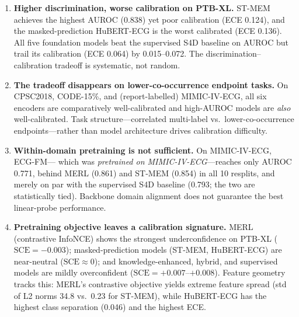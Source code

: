 \begin{enumerate}
  \item \textbf{Higher discrimination, worse calibration on PTB-XL.} ST-MEM achieves the
    highest AUROC (0.838) yet poor calibration (ECE 0.124), and the masked-prediction
    HuBERT-ECG is the worst calibrated (ECE 0.136). All five foundation models beat the
    supervised S4D baseline on AUROC but trail its calibration (ECE 0.064) by 0.015--0.072.
    The discrimination--calibration tradeoff is systematic, not random.

  \item \textbf{The tradeoff disappears on lower-co-occurrence endpoint tasks.} On CPSC2018,
    CODE-15\%, and (report-labelled) MIMIC-IV-ECG, all six encoders are comparatively
    well-calibrated and high-AUROC models are \emph{also} well-calibrated. Task
    structure---correlated multi-label vs.\ lower-co-occurrence endpoints---rather than model
    architecture drives calibration difficulty.

  \item \textbf{Within-domain pretraining is not sufficient.} On MIMIC-IV-ECG, ECG-FM---
    which was \emph{pretrained on MIMIC-IV-ECG}---reaches only AUROC 0.771, behind MERL
    (0.861) and ST-MEM (0.854) in all 10 resplits, and merely on par with the supervised
    S4D baseline (0.793; the two are statistically tied). Backbone domain alignment does not
    guarantee the best linear-probe performance.

  \item \textbf{Pretraining objective leaves a calibration signature.} MERL (contrastive
    InfoNCE) shows the strongest underconfidence on PTB-XL ($\text{SCE}=-0.003$);
    masked-prediction models (ST-MEM, HuBERT-ECG) are near-neutral ($\text{SCE}\approx0$);
    and knowledge-enhanced, hybrid, and supervised models are mildly overconfident
    ($\text{SCE}=+0.007$--$+0.008$). Feature geometry tracks this: MERL's contrastive
    objective yields extreme feature spread (std of L2 norms 34.8 vs.\ 0.23 for ST-MEM),
    while HuBERT-ECG has the highest class separation (0.046) and the highest ECE.
\end{enumerate}

